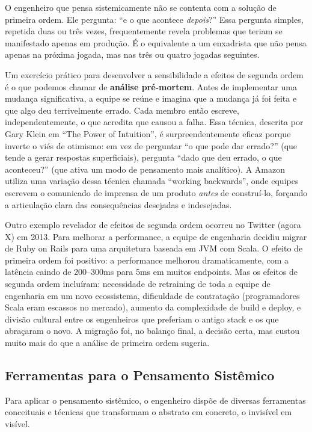 O engenheiro que pensa sistemicamente não se contenta com a solução de
primeira ordem. Ele pergunta: ``e o que acontece \emph{depois}?'' Essa
pergunta simples, repetida duas ou três vezes, frequentemente revela
problemas que teriam se manifestado apenas em produção. É o equivalente
a um enxadrista que não pensa apenas na próxima jogada, mas nas três ou
quatro jogadas seguintes.

Um exercício prático para desenvolver a sensibilidade a efeitos de
segunda ordem é o que podemos chamar de \textbf{análise pré-mortem}.
Antes de implementar uma mudança significativa, a equipe se reúne e
imagina que a mudança já foi feita e que algo deu terrivelmente errado.
Cada membro então escreve, independentemente, o que acredita que causou
a falha. Essa técnica, descrita por Gary Klein em ``The Power of
Intuition'', é surpreendentemente eficaz porque inverte o viés de
otimismo: em vez de perguntar ``o que pode dar errado?'' (que tende a
gerar respostas superficiais), pergunta ``dado que deu errado, o que
aconteceu?'' (que ativa um modo de pensamento mais analítico). A Amazon
utiliza uma variação dessa técnica chamada ``working backwards'', onde
equipes escrevem o comunicado de imprensa de um produto \emph{antes}
de construí-lo, forçando a articulação clara das consequências desejadas
e indesejadas.

Outro exemplo revelador de efeitos de segunda ordem ocorreu no Twitter
(agora X) em 2013. Para melhorar a performance, a equipe de engenharia
decidiu migrar de Ruby on Rails para uma arquitetura baseada em JVM com
Scala. O efeito de primeira ordem foi positivo: a performance melhorou
dramaticamente, com a latência caindo de 200--300ms para 5ms em muitos
endpoints. Mas os efeitos de segunda ordem incluíram: necessidade de
retraining de toda a equipe de engenharia em um novo ecossistema,
dificuldade de contratação (programadores Scala eram escassos no
mercado), aumento da complexidade de build e deploy, e divisão cultural
entre os engenheiros que preferiam o antigo stack e os que abraçaram o
novo. A migração foi, no balanço final, a decisão certa, mas custou
muito mais do que a análise de primeira ordem sugeria.

\subsection{Ferramentas para o Pensamento Sistêmico}

Para aplicar o pensamento sistêmico, o engenheiro dispõe de diversas
ferramentas conceituais e técnicas que transformam o abstrato em concreto,
o invisível em visível.

